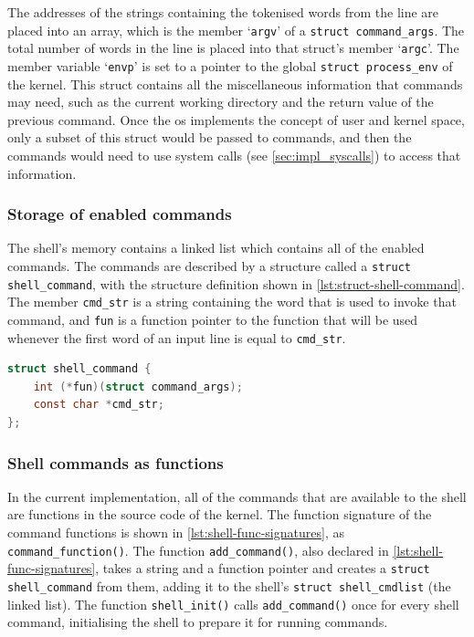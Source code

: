 \documentclass{article}
\begin{document}
The addresses of the strings containing the tokenised words from the line are
placed into an array, which is the member `\texttt{argv}' of a \texttt{struct
command\_args}. The total number of words in the line is placed into that
struct's member `\texttt{argc}'. The member variable `\texttt{envp}' is set to
a pointer to the global \texttt{struct process\_env} of the kernel. This struct
contains all the miscellaneous information that commands may need, such as the
current working directory and the return value of the previous command. Once
the \gls{os} implements the concept of user and kernel space, only a subset of
this struct would be passed to commands, and then the commands would need to
use system calls (see \autoref{sec:impl_syscalls}) to access that information.

\subsubsection{Storage of enabled commands}
The shell's memory contains a linked list which contains all of the enabled
commands. The commands are described by a structure called a \texttt{struct
shell\_command}, with the structure definition shown in
\autoref{lst:struct-shell-command}. The member \verb!cmd_str! is a string
containing the word that is used to invoke that command, and \verb!fun! is a
function pointer to the function that will be used whenever the first word of
an input line is equal to \verb!cmd_str!.

\begin{lstlisting}[language=C, caption={The definition of the
                   \texttt{shell\_command} struct}, float,
                   label={lst:struct-shell-command}]
struct shell_command {
    int (*fun)(struct command_args);
    const char *cmd_str;
};
\end{lstlisting}

\subsubsection{Shell commands as functions}
In the current implementation, all of the commands that are available to the
shell are functions in the source code of the kernel. The function signature of
the command functions is shown in \autoref{lst:shell-func-signatures}, as
\verb!command_function()!. The function \verb!add_command()!, also declared in
\autoref{lst:shell-func-signatures}, takes a string and a function pointer and
creates a \verb!struct shell_command! from them, adding it to the shell's
\verb!struct shell_cmdlist! (the linked list). The function \verb!shell_init()!
calls \verb!add_command()! once for every shell command, initialising the shell
to prepare it for running commands.
\end{document}
